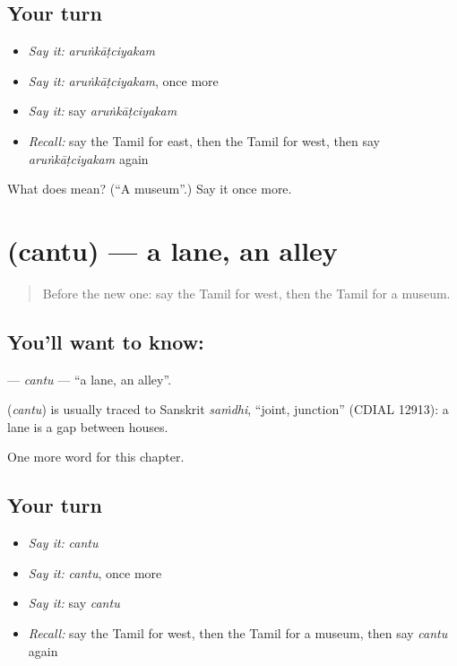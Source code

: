 \subsection*{Your turn}
\begin{itemize}
\raggedright
  \item \emph{Say it:} \emph{aruṅkāṭciyakam}
  \item \emph{Say it:} \emph{aruṅkāṭciyakam}, once more
  \item \emph{Say it:} say \emph{aruṅkāṭciyakam}
  \item \emph{Recall:} say the Tamil for east, then the Tamil for west, then say \emph{aruṅkāṭciyakam} again
\end{itemize}

\begin{tcolorbox}[breakable,colback=teal!4,colframe=teal!35!black,title={Before you move on}]
What does  mean? (\textquotedblleft{}A museum\textquotedblright{}.) Say it once more.
\end{tcolorbox}
\section[\texorpdfstring{\ta{சந்து} (cantu)}{சந்து (cantu)}]{ (cantu) — a lane, an alley}

\label{lesson:TA-C236-cantu}



\begin{quote}
Before the new one: say the Tamil for west, then the Tamil for a museum.
\end{quote}

\subsection*{You'll want to know: }
\textbf{} — \emph{cantu} — \textquotedblleft{}a lane, an alley\textquotedblright{}.

\begin{cousinweb}
\textbf{} (\emph{cantu}) is usually traced to Sanskrit \emph{saṁdhi}, \textquotedblleft{}joint, junction\textquotedblright{} (CDIAL 12913): a lane is a gap between houses.
\end{cousinweb}

\begin{grammarlens}[title={What you've built}]
One more word for this chapter.
\end{grammarlens}

\subsection*{Your turn}
\begin{itemize}
\raggedright
  \item \emph{Say it:} \emph{cantu}
  \item \emph{Say it:} \emph{cantu}, once more
  \item \emph{Say it:} say \emph{cantu}
  \item \emph{Recall:} say the Tamil for west, then the Tamil for a museum, then say \emph{cantu} again
\end{itemize}

